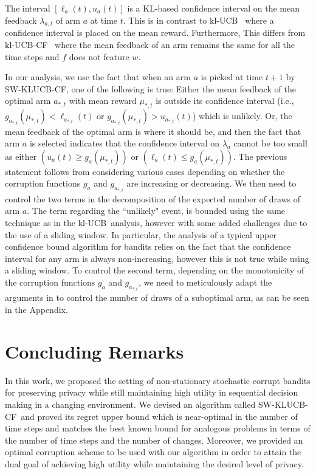 \documentclass[letterpaper]{article} %
\newcommand{\KLUCBCF}{$\mathrm{kl}$-\textsc{UCB-CF}}
\newcommand{\SWKLUCBCF}{\textsc{SW-KLUCB-CF}}
\newcommand{\KLUCB}{$\mathrm{kl}$-\textsc{UCB}}
\newcommand{\optArm}[1]{a_{*, #1}}
\newcommand{\optMean}[1]{\mu_{*, #1}}
\newcommand{\meanFeedback}[2]{\lambda_{#1, #2}}
\newcommand{\windowsize}{w}
\begin{document}
\vspace{-0.72mm}
The interval $[\ell_a(t), u_a(t)]$ is a KL-based confidence interval on the mean feedback $\meanFeedback{a}{t}$ of arm $a$ at time $t$.
This is in contrast to \KLUCB\ \citep{KLUCBJournal} where a confidence interval is placed on the mean reward. Furthermore,
This differs from \KLUCBCF \ \cite{pmlr-v83-gajane18a} where the mean feedback of an arm remains the same for all the time steps and $f$ does not feature $\windowsize$.

In our analysis, we use the fact that when an arm $a$ is picked at time $t+1$ by \SWKLUCBCF, one of the following is true:
Either the mean feedback of the optimal arm $\optArm{t}$ with mean reward $\optMean{t}$ is outside its confidence interval (i.e., $g_{\optArm{t}}(\optMean{t}) < \ell_{\optArm{t}}(t)$ or $g_{\optArm{t}}(\optMean{t}) > u_{\optArm{t}}(t)$) which is unlikely. Or,
the mean feedback of the optimal arm is where it should be, and then the fact that arm $a$ is selected indicates that the confidence interval on $\lambda_a$ cannot be too small as either $(u_a(t) \geq g_a(\optMean{t}))$ or $(\ell_a(t) \leq g_a(\optMean{t}))$.
The previous statement follows from considering various cases depending on whether the corruption functions $g_a$ and $g_{\optArm{t}}$ are increasing or decreasing.
We then need to control the two terms in the decomposition of the expected number of draws of arm $a$. The term regarding the ``unlikely" event, is bounded using the same technique as in the \KLUCB \ analysis, however with some added challenges due to the use of a sliding window. In particular, the analysis of a typical upper confidence bound algorithm for bandits relies on the fact that the confidence interval for any arm is always non-increasing, however this is not true while using a sliding window. To control the second term, depending on the monotonicity of the corruption functions $g_a$ and $g_{\optArm{t}}$, we need to meticulously adapt the arguments in \citet{KLUCBJournal} to control the number of draws of a suboptimal arm, as can be seen in the Appendix.

\vspace{-1.67mm}
\section{Concluding Remarks}
In this work, we proposed the setting of non-stationary stochastic corrupt bandits for preserving privacy while still maintaining high utility in sequential decision making in a changing environment. We devised an algorithm called \SWKLUCBCF \ and proved its regret upper bound which is near-optimal in the number of time steps and matches the best known bound for analogous problems in terms of the number of time steps and the number of changes. Moreover, we provided an optimal corruption scheme to be used with our algorithm in order to attain the dual goal of achieving high utility while maintaining the desired level of privacy.
\end{document}
